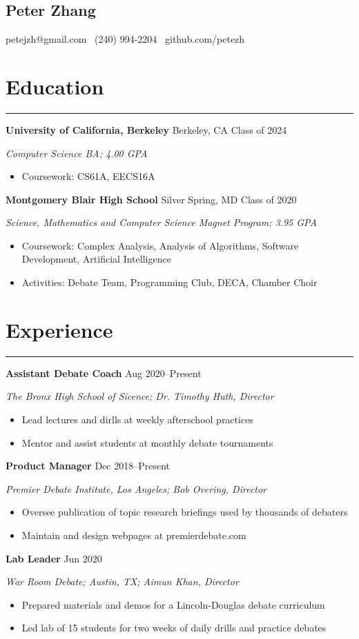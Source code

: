 \documentclass[11pt]{article}
\newcommand{\name}[1]{\begin{center}\section*{\huge \color{highlight} #1}\end{center}}
\newcommand{\topinfo}[1]{\begin{center}\vspace{-0.2cm}#1\vspace{-0.2cm}\end{center}}
\newcommand{\resumesection}[1]{\vspace{-0.3cm}\section*{\color{highlight}#1}\vspace{-0.3cm}\hrule\vspace{0.3cm}}
\begin{document}
\name{Peter Zhang}
\topinfo{petejzh@gmail.com \textbullet\ (240) 994-2204 \textbullet\ github.com/petezh}

\resumesection{Education}

\textbf{University of California, Berkeley} Berkeley, CA \hfill Class of 2024 \par
\textit{Computer Science BA; 4.00 GPA}
\begin{itemize}
	\item Coursework: CS61A, EECS16A
\end{itemize}

\textbf{Montgomery Blair High School} Silver Spring, MD \hfill Class of 2020 \par
\textit{Science, Mathematics and Computer Science Magnet Program; 3.95 GPA}

\begin{itemize}
	\item Coursework: Complex Analysis, Analysis of Algorithms, Software Development, Artificial Intelligence
	\item Activities: Debate Team, Programming Club, DECA, Chamber Choir
\end{itemize}

\resumesection{Experience}

\textbf{Assistant Debate Coach}  \hfill Aug 2020--Present \par
\textit{The Bronx High School of Sicence; Dr. Timothy Huth, Director}
\begin{itemize}
	\item Lead lectures and dirlls at weekly afterschool practices
	\item Mentor and assist students at monthly debate tournaments
\end{itemize}

\textbf{Product Manager}   \hfill Dec 2018--Present \par
\textit{Premier Debate Institute, Los Angeles; Bob Overing, Director}
\begin{itemize}
	\item Oversee publication of topic research briefings used by thousands of debaters
	\item Maintain and design webpages at premierdebate.com
\end{itemize}

\textbf{Lab Leader}  \hfill Jun 2020 \par
\textit{War Room Debate; Austin, TX; Aimun Khan, Director}
\begin{itemize}
	\item Prepared materials and demos for a Lincoln-Douglas debate curriculum
	\item Led lab of 15 students for two weeks of daily drills and practice debates
\end{itemize}
\end{document}
